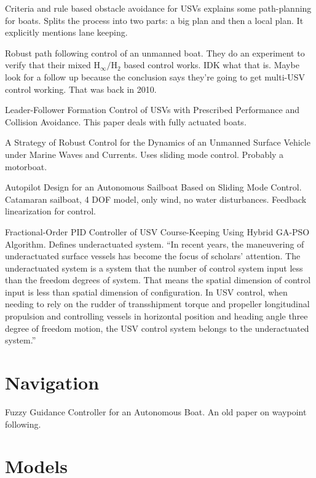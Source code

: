 \documentclass[conference]{IEEEtran}
\begin{document}
\cite{Tan2010} Criteria and rule based obstacle avoidance for USVs explains some path-planning for boats. Splits the process into two parts: a big plan and then a local plan. It explicitly mentions lane keeping.

\cite{Yu2010} Robust path following control of an unmanned boat. They do an experiment to verify that their mixed \(\mathrm{H}_\infty / \mathrm{H}_2\) based control works. IDK what that is. Maybe look for a follow up because the conclusion says they're going to get multi-USV control working. That was back in 2010.

\cite{Dai2017} Leader-Follower Formation Control of USVs with Prescribed Performance and Collision Avoidance. This paper deals with fully actuated boats.

\cite{Velueta2019} A Strategy of Robust Control for the Dynamics of an Unmanned Surface Vehicle under Marine Waves and Currents. Uses sliding mode control. Probably a motorboat. 

\cite{HelmiAbrougui2019} Autopilot Design for an Autonomous Sailboat Based on Sliding Mode Control. Catamaran sailboat, 4 DOF model, only wind, no water disturbances. Feedback linearization for control.

\cite{Li2016} Fractional-Order PID Controller of USV Course-Keeping Using Hybrid GA-PSO Algorithm. Defines underactuated system. \enquote{In recent years, the maneuvering of underactuated surface vessels has become the focus of scholars’ attention. The underactuated system is a system that the number of control system input less than the freedom degrees of system. That means the spatial dimension of control input is less than spatial dimension of configuration. In USV control, when needing to rely on the rudder of transshipment torque and propeller longitudinal propulsion and controlling vessels in horizontal position and heading angle three degree of freedom motion, the USV control system belongs to the underactuated system.}



\section{Navigation}
\cite{Vaneck1997} Fuzzy Guidance Controller for an Autonomous Boat. An old paper on waypoint following.

 

\section{Models}
\end{document}
